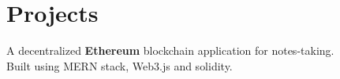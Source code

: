 \documentclass[]{deedy-resume-openfont}
\begin{document}
\begin{minipage}[t]{0.66\textwidth}

\section{Projects}
\sectionsep
\runsubsection{}
A decentralized {\fontsize{11pt}{10pt}\selectfont\bfseries Ethereum} blockchain application for notes-taking.\\
Built using MERN stack, Web3.js and solidity.
\sectionsep






 

\end{minipage} 
\end{document}
